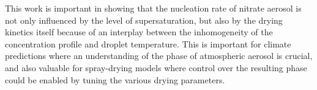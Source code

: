 \documentclass[11pt,twoside]{report}
\def\includebibliography{}
\begin{document}


This work is important in showing that the nucleation rate of nitrate aerosol is not only influenced by the level of supersaturation, but also by the drying kinetics itself because of an interplay between the inhomogeneity of the concentration profile and droplet temperature.
This is important for climate predictions where an understanding of the phase of atmospheric aerosol is crucial, and also valuable for spray-drying models where control over the resulting phase could be enabled by tuning the various drying parameters.



\ifdefined\includebibliography
  \printbibliography
\fi
\end{document}
